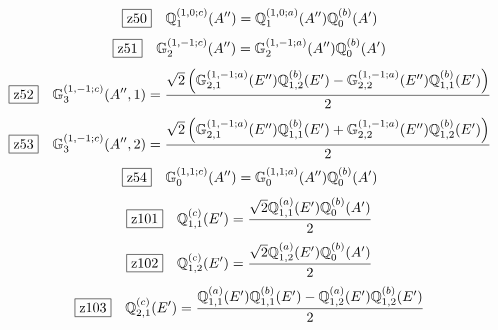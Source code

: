\documentclass[fleqn,10pt,landscape]{jsarticle}
\begin{document}
\begin{dmath*}
\hspace*{3mm}\fbox{z50}\quad \mathbb{Q}_{1}^{(1,0;c)}(A^{\prime\prime})=\mathbb{Q}_{1}^{(1,0;a)}(A^{\prime\prime}) \mathbb{Q}_{0}^{(b)}(A^{\prime})
\end{dmath*}
\begin{dmath*}
\hspace*{3mm}\fbox{z51}\quad \mathbb{G}_{2}^{(1,-1;c)}(A^{\prime\prime})=\mathbb{G}_{2}^{(1,-1;a)}(A^{\prime\prime}) \mathbb{Q}_{0}^{(b)}(A^{\prime})
\end{dmath*}
\begin{dmath*}
\hspace*{3mm}\fbox{z52}\quad \mathbb{G}_{3}^{(1,-1;c)}(A^{\prime\prime},1)=\frac{\sqrt{2} \left(\mathbb{G}_{2,1}^{(1,-1;a)}(E^{\prime\prime}) \mathbb{Q}_{1,2}^{(b)}(E^{\prime}) - \mathbb{G}_{2,2}^{(1,-1;a)}(E^{\prime\prime}) \mathbb{Q}_{1,1}^{(b)}(E^{\prime})\right)}{2}
\end{dmath*}
\begin{dmath*}
\hspace*{3mm}\fbox{z53}\quad \mathbb{G}_{3}^{(1,-1;c)}(A^{\prime\prime},2)=\frac{\sqrt{2} \left(\mathbb{G}_{2,1}^{(1,-1;a)}(E^{\prime\prime}) \mathbb{Q}_{1,1}^{(b)}(E^{\prime}) + \mathbb{G}_{2,2}^{(1,-1;a)}(E^{\prime\prime}) \mathbb{Q}_{1,2}^{(b)}(E^{\prime})\right)}{2}
\end{dmath*}
\begin{dmath*}
\hspace*{3mm}\fbox{z54}\quad \mathbb{G}_{0}^{(1,1;c)}(A^{\prime\prime})=\mathbb{G}_{0}^{(1,1;a)}(A^{\prime\prime}) \mathbb{Q}_{0}^{(b)}(A^{\prime})
\end{dmath*}
\begin{dmath*}
\hspace*{3mm}\fbox{z101}\quad \mathbb{Q}_{1,1}^{(c)}(E^{\prime})=\frac{\sqrt{2} \mathbb{Q}_{1,1}^{(a)}(E^{\prime}) \mathbb{Q}_{0}^{(b)}(A^{\prime})}{2}
\end{dmath*}
\begin{dmath*}
\hspace*{3mm}\fbox{z102}\quad \mathbb{Q}_{1,2}^{(c)}(E^{\prime})=\frac{\sqrt{2} \mathbb{Q}_{1,2}^{(a)}(E^{\prime}) \mathbb{Q}_{0}^{(b)}(A^{\prime})}{2}
\end{dmath*}
\begin{dmath*}
\hspace*{3mm}\fbox{z103}\quad \mathbb{Q}_{2,1}^{(c)}(E^{\prime})=\frac{\mathbb{Q}_{1,1}^{(a)}(E^{\prime}) \mathbb{Q}_{1,1}^{(b)}(E^{\prime}) - \mathbb{Q}_{1,2}^{(a)}(E^{\prime}) \mathbb{Q}_{1,2}^{(b)}(E^{\prime})}{2}
\end{dmath*}
\end{document}
